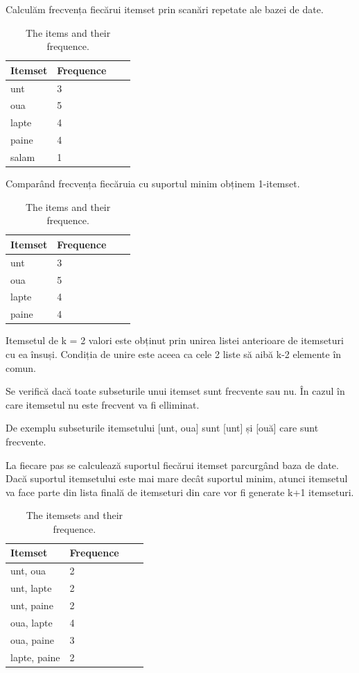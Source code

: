 \documentclass[11pt]{diazessay} %
\begin{document}
Calculăm  frecvența fiecărui itemset prin scanări repetate ale bazei de date.

\begin{table}[h]
\caption{The items and their frequence.}
\centering
\begin{tabular}{llll}
		\toprule
		\cmidrule(r){1-2}
		Itemset & Frequence \\
		\midrule
		unt & 3 &  \\
		oua & 5&  \\
      	lapte & 4 &  \\
      	paine& 4&  \\
      	salam & 1& 
\end{tabular}
\end{table}

Comparând frecvența fiecăruia cu suportul minim obținem 1-itemset.

\begin{table}[h]
\caption{The items and their frequence.}
\centering
\begin{tabular}{llll}
		\toprule
		\cmidrule(r){1-2}
		Itemset & Frequence \\
		\midrule
		unt & 3 &  \\
		oua & 5&  \\
      	lapte & 4 &  \\
      	paine& 4&  \\
\end{tabular}
\end{table}

Itemsetul de k = 2 valori este obținut prin unirea listei anterioare de itemseturi cu ea însuși. Condiția de unire este aceea ca cele 2 liste să aibă k-2 elemente în comun.

Se verifică dacă toate subseturile unui itemset sunt frecvente sau nu. În cazul în care itemsetul nu este frecvent va fi elliminat.
 
De exemplu subseturile itemsetului [unt, oua] sunt [unt] și [ouă] care sunt frecvente.

La fiecare pas se calculează suportul fiecărui itemset parcurgând baza de date. Dacă suportul itemsetului este mai mare decât suportul minim, atunci itemsetul va face parte din lista finală de itemseturi din care vor fi generate k+1 itemseturi.

\begin{table}[h]
\caption{The itemsets and their frequence.}
\centering
\begin{tabular}{llll}
		\toprule
		\cmidrule(r){1-2}
		Itemset & Frequence \\
		\midrule
		unt, oua & 2 &  \\
		unt, lapte & 2&  \\
      	unt, paine & 2 &  \\
      	oua, lapte & 4&  \\
      	oua, paine & 3&  \\
      	lapte, paine & 2&  \\
\end{tabular}
\end{table}
\end{document}
